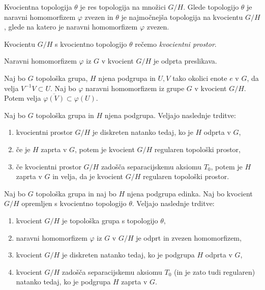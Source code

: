 \documentclass[mat1]{fmfdelo}
\newcommand{\closure}[1]{\overline{#1}}
\begin{document}
\begin{izrek}\label{izr:topkvocienta}
Kvocientna topologija $\theta$ je res topologija na množici $G/H$. Glede topologijo $\theta$ je naravni homomorfizem $\varphi$ zvezen in $\theta$ je najmočnejša topologija na kvocientu $G/H$, glede na katero je naravni homomorfizem $\varphi$ zvezen.
\end{izrek}

Kvocientu $G/H$ s kvocientno topologijo $\theta$ rečemo \emph{kvocientni prostor}.

\begin{trditev}\label{trd:homoodprt}
Naravni homomorfizem $\varphi$ iz $G$ v kvocient $G/H$ je odprta preslikava.
\end{trditev}

\begin{trditev}\label{trd:okolicevkvoc}
Naj bo $G$ topološka grupa, $H$ njena podgrupa in $U, V$ tako okolici enote $e$ v $G$, da velja $V^{-1}V \subset U$. Naj bo $\varphi$ naravni homomorfizem iz grupe $G$ v kvocient $G/H$. Potem velja $\closure{\varphi(V)} \subset \varphi(U)$.
\end{trditev}

\begin{izrek}
Naj bo $G$ topološka grupa in $H$ njena podgrupa. Veljajo naslednje trditve:
\begin{enumerate}
\item kvocientni prostor $G/H$ je diskreten natanko tedaj, ko je $H$ odprta v $G$,
\item če je $H$ zaprta v $G$, potem je kvocient $G/H$ regularen topološki prostor,
\item če kvocientni prostor $G/H$ zadošča separacijskemu aksiomu $T_0$, potem je $H$ zaprta v $G$ in velja, da je kvocient $G/H$ regularen topološki prostor.
\end{enumerate}
\end{izrek}

\begin{izrek}\label{izr:kvocpovzetek}
Naj bo $G$ topološka grupa in naj bo $H$ njena podgrupa edinka. Naj bo kvocient $G/H$ opremljen s kvocientno topologijo $\theta$. Veljajo naslednje trditve:
\begin{enumerate}
\item kvocient $G/H$ je topološka grupa s topologijo $\theta$,
\item naravni homomorfizem $\varphi$ iz $G$ v $G/H$ je odprt in zvezen homomorfizem,
\item kvocient $G/H$ je diskreten natanko tedaj, ko je podgrupa $H$ odprta v $G$,
\item kvocient $G/H$ zadošča separacijskemu aksiomu $T_0$ (in je zato tudi regularen) natanko tedaj, ko je podgrupa $H$ zaprta v $G$.
\end{enumerate}
\end{izrek}
\end{document}
